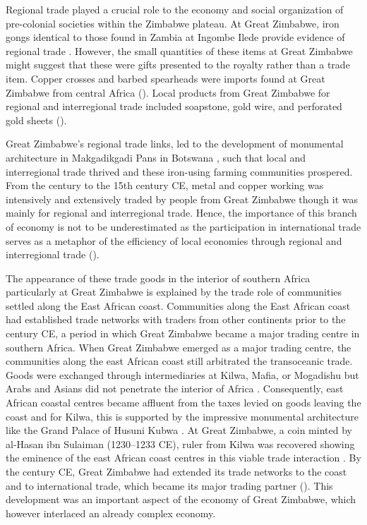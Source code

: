 Regional trade played a crucial role to the economy and social organization of pre-colonial societies within the Zimbabwe plateau. At Great Zimbabwe, iron gongs identical to those found in Zambia at Ingombe Ilede provide evidence of regional trade \parencite{garlake1973}. However, the small quantities of these items at Great Zimbabwe might suggest that these were gifts presented to the royalty rather than a trade item. Copper crosses and barbed spearheads were imports found at Great Zimbabwe from central Africa (\cites{pikirayi2006}{pikirayi2017}). Local products from Great Zimbabwe for regional and interregional trade included soapstone, gold wire, and perforated gold sheets (\cites{garlake1973}{pikirayi2006}{pikirayi2017}).

Great Zimbabwe’s regional trade links, led to the development of monumental architecture in Makgadikgadi Pans in Botswana \parencite{pikirayi2017}, such that local and interregional trade thrived and these iron-using farming communities prospered. From the  century to the 15th century CE, metal and copper working was intensively and extensively traded by people from Great Zimbabwe \parencite{garlake1973} though it was mainly for regional and interregional trade. Hence, the importance of this branch of economy is not to be underestimated as the participation in international trade serves as a metaphor of  the efficiency of local economies through regional and interregional trade (\cites{pwiti1991}{pwiti2005}{manyanga2006}{pikirayi2006}).

The appearance of these trade goods in the interior of southern Africa particularly at Great Zimbabwe is explained by the trade role of  communities settled along the East African coast. Communities along the East African coast had established trade networks with traders from other continents prior to the  century CE,
a period in which Great Zimbabwe became a major trading centre in southern Africa. When Great Zimbabwe emerged as a major trading centre, the communities along the east African coast still arbitrated the transoceanic trade. Goods were exchanged through intermediaries at Kilwa, Mafia, or Mogadishu but Arabs and Asians did not penetrate the interior of Africa \parencite{alradi1990}. Consequently, east African coastal centres became affluent from the taxes levied on goods leaving the coast \parencite{alradi1990} and for Kilwa, this is supported by the impressive monumental architecture like the Grand Palace of Husuni Kubwa \parencite{pikirayi2006}.
At Great Zimbabwe, a coin minted by al-Hasan ibn Sulaiman (1230--1233 CE), ruler from Kilwa was recovered showing the eminence of the east African coast centres in this viable trade interaction
\parencite{pikirayi2006}. By the  century CE, Great Zimbabwe had extended its trade networks to the coast and to international trade, which became its major trading partner (\cites{pwiti2005}{kusimba2007}{kim2008}). This development was an important aspect of the economy of Great Zimbabwe, which however interlaced an already complex economy.

